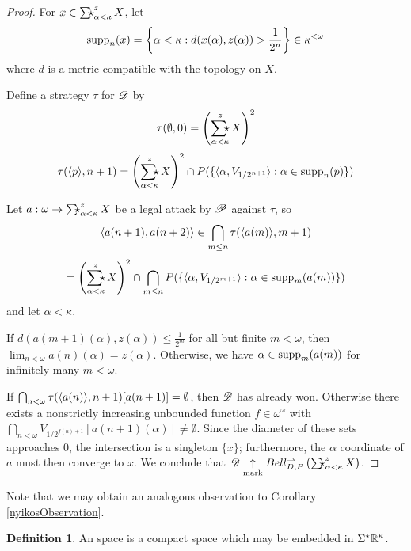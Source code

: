 \documentclass{amsart}
\theoremstyle{definition}
\newtheorem{definition}[theorem]{Definition}
\begin{document}
  \begin{proof}
    For \(x\in\SigmaStarProd_{\alpha<\kappa}^z X\), let
      \[
        \textrm{supp}_n(x)
          =
        \left\{
          \alpha<\kappa
        :
          d(x(\alpha),z(\alpha))>\frac{1}{2^n}
        \right\}
          \in
        \kappa^{<\omega}
      \]
    where \(d\) is a metric compatible with the topology on \(X\).

    Define a strategy \(\tau\) for \(\mathscr{D}\) by
      \[
        \tau(\emptyset,0)
          =
        \left(\SigmaStarProd_{\alpha<\kappa}^z X\right)^2
      \]
      \[
        \tau(\<p\>,n+1)
          =
        \left(\SigmaStarProd_{\alpha<\kappa}^z X\right)^2
          \cap
        P(\{
          \<\alpha,V_{1/2^{n+1}}\>
            :
          \alpha\in\supp_n(p)
        \})
      \]

    Let \(a:\omega\to \SigmaStarProd_{\alpha<\kappa}^z X\) be a legal
    attack by \(\mathscr{P}\) against \(\tau\), so
      \[
        \langle a(n+1),a(n+2)\rangle
          \in
        \bigcap_{m\leq n}
        \tau(\langle a(m)\rangle,m+1)
      \]
      \[
          =
        \left(\SigmaStarProd_{\alpha<\kappa}^z X\right)^2
          \cap
        \bigcap_{m\leq n}
        P(\{
          \<\alpha,V_{1/2^{m+1}}\>
            :
          \alpha\in\supp_m(a(m))
        \})
      \]
    and let \(\alpha<\kappa\).

    If \(d(a(m+1)(\alpha),z(\alpha))\leq\frac{1}{2^m}\) for all but finite
    \(m<\omega\), then  \(\lim_{n<\omega}a(n)(\alpha)=z(\alpha)\).
    Otherwise, we have \(\alpha\in\textrm{supp}_m(a(m))\) for infinitely many
    \(m<\omega\).

    If
    \(\bigcap_{n<\omega}\tau(\langle a(n)\rangle,n+1)[a(n+1)]=\emptyset\), then
    \(\mathscr{D}\) has already won.
    Otherwise there exists a nonstrictly increasing
    unbounded function \(f\in\omega^\omega\) with
    \(\bigcap_{n<\omega}V_{1/2^{f(n)+1}}[a(n+1)(\alpha)]\not=\emptyset\).
    Since the diameter of these sets approaches \(0\), the intersection is
    a singleton \(\{x\}\); furthermore, the \(\alpha\) coordinate of \(a\)
    must then converge to \(x\). We conclude that
    \(\pl D\markwin\bellConGame{\SigmaStarProd_{\alpha<\kappa}^z X}\).
  \end{proof}

  Note that we may obtain an analogous observation to Corollary
  \ref{nyikosObservation}.

  \begin{definition}
    An  space is a compact space which may be embedded
    in \(\Sigma^\star\mathbb{R}^{\kappa}\).
  \end{definition}
\end{document}
